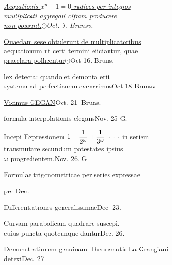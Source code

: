 \clearpage{}\NoSourceHead
\begingroup\fontsize{10}{15}\selectfont\itshape
\noindent\underline{Aequationis \(x^p-1=0\) radices per integros}\\
\hspace*{2em}\underline{multiplicati aggregati cifram producere}\\
\hspace*{2em}\underline{non possunt.}\hfill\(\odot\)\quad Oct. 9. Brunsv.

\medskip
\noindent\underline{Quaedam sese obtulerunt de multiplicatoribus}\\
\hspace*{2em}\underline{aequationum ut certi termini eiiciantur, quae}\\
\hspace*{2em}\underline{praeclara pollicentur}\hfill\(\odot\)\quad Oct 16. Bruns.

\medskip
\noindent\underline{lex detecta: quando et demonta erit}\\
\hspace*{2em}\underline{systema ad perfectionem evexerimus}\hfill Oct 18 Brunsv.

\medskip
\noindent\makebox[1.2em][l]{\(\ast\)}\underline{Vicimus GEGAN}\hfill Oct. 21. Bruns.

\medskip
\noindent formula interpolationis elegans\hfill Nov. 25 G.

\medskip
\noindent Incepi Expressionem \(1-\dfrac1{2^\omega}+\dfrac1{3^\omega}\mathpunct{\raisebox{-1.2ex}{.}}\,\cdotp\,\cdotp\,\cdotp\) in seriem\\
\hspace*{2em}transmutare secundum potestates ipsius\\
\hspace*{2em}\(\omega\) progredientem.\hfill Nov. 26. G

\medskip
\noindent Formulae trigonometricae per series expressae
\begin{flushright}per Dec.\end{flushright}

\noindent Differentiationes generalissimae\hfill Dec. 23.

\medskip
\noindent Curvam parabolicam quadrare suscepi.\\
\hspace*{2em}cuius puncta quotcunque dantur\hfill Dec. 26.

\medskip
\noindent Demonstrationem genuinam Theorematis La Grangiani\\
\hspace*{2em}detexi\hfill Dec. 27
\endgroup
